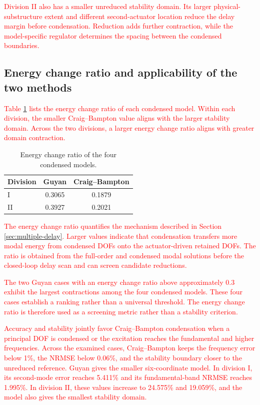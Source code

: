 \documentclass[11pt,a4paper]{article}
\numberwithin{equation}{section}
\newcommand{\rev}[1]{\textcolor{red}{#1}}
\begin{document}
\rev{Division II also has a smaller unreduced stability domain. Its larger physical-substructure extent and different second-actuator location reduce the delay margin before condensation. Reduction adds further contraction, while the model-specific regulator determines the spacing between the condensed boundaries.}

\subsection{Energy change ratio and applicability of the two methods}
\label{sec:energy-applicability}

\rev{Table \ref{tab:energy} lists the energy change ratio of each condensed model. Within each division, the smaller Craig--Bampton value aligns with the larger stability domain. Across the two divisions, a larger energy change ratio aligns with greater domain contraction.}

\begin{table}[htbp]
	\centering
	\caption{Energy change ratio of the four condensed models.}
	\label{tab:energy}
	\begin{tabular}{lcc}
		\toprule
		Division & Guyan & Craig--Bampton\\
		\midrule
		I  & 0.3065 & 0.1879\\
		II & 0.3927 & 0.2021\\
		\bottomrule
	\end{tabular}
\end{table}

\rev{The energy change ratio quantifies the mechanism described in Section \ref{sec:multiple-delay}. Larger values indicate that condensation transfers more modal energy from condensed DOFs onto the actuator-driven retained DOFs. The ratio is obtained from the full-order and condensed modal solutions before the closed-loop delay scan and can screen candidate reductions.}

\rev{The two Guyan cases with an energy change ratio above approximately 0.3 exhibit the largest contractions among the four condensed models. These four cases establish a ranking rather than a universal threshold. The energy change ratio is therefore used as a screening metric rather than a stability criterion.}

\rev{Accuracy and stability jointly favor Craig--Bampton condensation when a principal DOF is condensed or the excitation reaches the fundamental and higher frequencies. Across the examined cases, Craig--Bampton keeps the frequency error below 1\%, the NRMSE below 0.06\%, and the stability boundary closer to the unreduced reference. Guyan gives the smaller six-coordinate model. In division I, its second-mode error reaches 5.411\% and its fundamental-band NRMSE reaches 1.995\%. In division II, these values increase to 24.575\% and 19.059\%, and the model also gives the smallest stability domain.}
\end{document}
